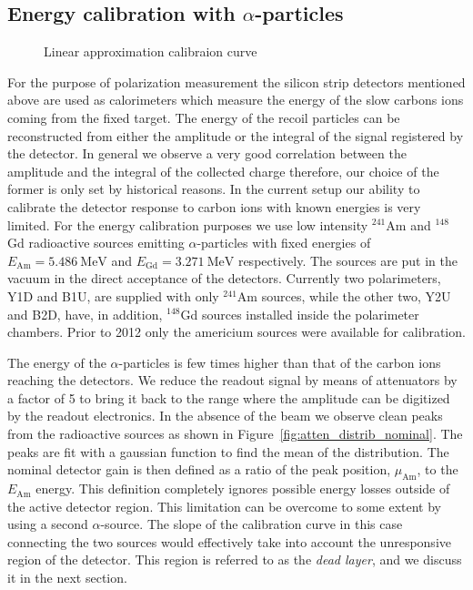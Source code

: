 \documentclass[a4paper,12pt]{article}
\newcommand\americium{${}^{241}$Am}
\newcommand\gadolinium{${}^{148}$Gd}
\begin{document}
\subsection{Energy calibration with $\alpha$-particles}

\begin{figure}
\vspace{-\baselineskip} %
\begin{flushright}

\end{flushright}
\caption{Linear approximation calibraion curve}
\label{fig:calib_curve}
\end{figure}

For the purpose of polarization measurement the silicon strip detectors
mentioned above are used as calorimeters which measure the energy of the slow
carbons ions coming from the fixed target. The energy of the recoil particles
can be reconstructed from either the amplitude or the integral of the signal
registered by the detector. In general we observe a very good correlation
between the amplitude and the integral of the collected charge therefore, our
choice of the former is only set by historical reasons. In the current setup our
ability to calibrate the detector response to carbon ions with known energies is
very limited. For the energy calibration purposes we use low intensity
\americium{} and \gadolinium{} radioactive sources emitting $\alpha$-particles
with fixed energies of $E_{\text{Am}} = 5.486~\text{MeV}$ and $E_{\text{Gd}} =
3.271~\text{MeV}$ respectively. The sources are put in the vacuum in the direct
acceptance of the detectors. Currently two polarimeters, Y1D and B1U, are
supplied with only \americium{} sources, while the other two, Y2U and B2D, have,
in addition, \gadolinium{} sources installed inside the polarimeter chambers.
Prior to 2012 only the americium sources were available for calibration.

The energy of the $\alpha$-particles is few times higher than that of the carbon
ions reaching the detectors. We reduce the readout signal by means of
attenuators by a factor of 5 to bring it back to the range where the amplitude
can be digitized by the readout electronics. In the absence of the beam we
observe clean peaks from the radioactive sources as shown in
Figure~\ref{fig:atten_distrib_nominal}. The peaks are fit with a gaussian
function to find the mean of the distribution. The nominal detector gain is then
defined as a ratio of the peak position, $\mu_{\text{Am}}$, to the
$E_{\text{Am}}$ energy. This definition completely ignores possible energy
losses outside of the active detector region. This limitation can be overcome to
some extent by using a second $\alpha$-source. The slope of the calibration
curve in this case connecting the two sources would effectively take into
account the unresponsive region of the detector. This region is referred to as
the {\it dead layer}, and we discuss it in the next section.
\end{document}
